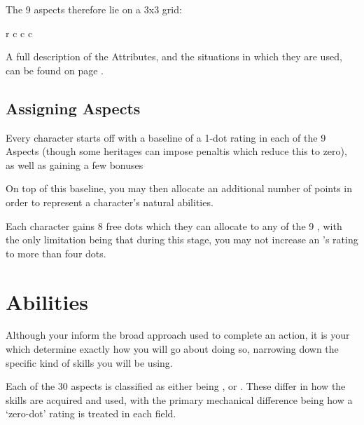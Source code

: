 The 9 aspects therefore lie on a 3x3 grid:

\begin{center}
	\begin{rndtable}{r c c c}
	\end{rndtable}
\end{center}

A full description of the Attributes, and the situations in which they are used, can be found on page \pageref{S:Proficiencies}.

\subsection{Assigning Aspects}

Every character starts off with a baseline of a 1-dot rating in each of the 9 Aspects (though some  heritages can impose penaltis which reduce this to zero), as well as gaining a few bonuses 

On top of this baseline, you may then allocate an additional number of points in order to represent a character's natural abilities.

Each character gains 8 free dots which they can allocate to any of the 9 , with the only limitation being that during this stage, you may not increase an 's rating to more than four dots. 


\section{Abilities}

Although your  inform the broad approach used to complete an action, it is your  which determine exactly how you will go about doing so, narrowing down the specific kind of skills you will be using. 

Each of the 30 aspects is classified as either being ,  or . These differ in how the skills are acquired and used, with the primary mechanical difference being how a `zero-dot' rating is treated in each field. 

